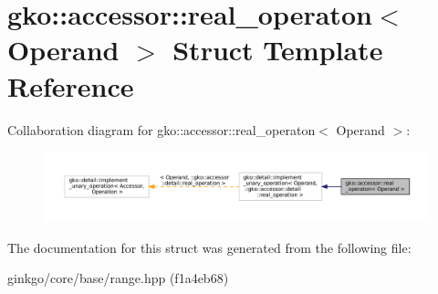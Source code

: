 \hypertarget{structgko_1_1accessor_1_1real__operaton}{}\section{gko\+:\+:accessor\+:\+:real\+\_\+operaton$<$ Operand $>$ Struct Template Reference}
\label{structgko_1_1accessor_1_1real__operaton}


Collaboration diagram for gko\+:\+:accessor\+:\+:real\+\_\+operaton$<$ Operand $>$\+:
\nopagebreak
\begin{figure}[H]
\begin{center}
\leavevmode
\includegraphics[width=350pt]{structgko_1_1accessor_1_1real__operaton__coll__graph}
\end{center}
\end{figure}


The documentation for this struct was generated from the following file\+:\begin{DoxyCompactItemize}
\item 
ginkgo/core/base/range.\+hpp (f1a4eb68)\end{DoxyCompactItemize}
